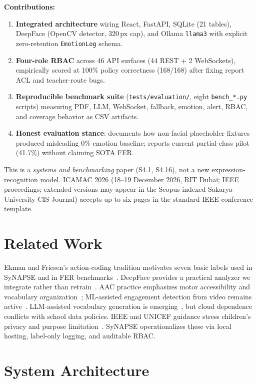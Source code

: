 \documentclass[conference]{IEEEtran}
\begin{document}
\textbf{Contributions:}
\begin{enumerate}
  \item \textbf{Integrated architecture} wiring React, FastAPI, SQLite (21 tables), DeepFace (OpenCV detector, 320\,px cap), and Ollama \texttt{llama3} with explicit zero-retention \texttt{EmotionLog} schema.
  \item \textbf{Four-role RBAC} across 46 API surfaces (44 REST + 2 WebSockets), empirically scored at 100\% policy correctness (168/168) after fixing report ACL and teacher-route bugs.
  \item \textbf{Reproducible benchmark suite} (\texttt{tests/evaluation/}, eight \texttt{bench\_*.py} scripts) measuring PDF, LLM, WebSocket, fallback, emotion, alert, RBAC, and coverage behavior as CSV artifacts.
  \item \textbf{Honest evaluation stance}: documents how non-facial placeholder fixtures produced misleading 0\% emotion baseline; reports current partial-class pilot (41.7\%) without claiming SOTA FER.
\end{enumerate}

This is a \emph{systems and benchmarking} paper (S4.1, S4.16), not a new expression-recognition model. ICAMAC 2026 (18--19 December 2026, RIT Dubai; IEEE proceedings; extended versions may appear in the Scopus-indexed Sakarya University CIS Journal) accepts up to six pages in the standard IEEE conference template.

\section{Related Work}
Ekman and Friesen's action-coding tradition motivates seven basic labels used in SyNAPSE and in FER benchmarks~\cite{ekman1978,goodfellow2013}. DeepFace provides a practical analyzer we integrate rather than retrain~\cite{serengil2020}. AAC practice emphasizes motor accessibility and vocabulary organization~\cite{asha2023,rowland2024}; ML-assisted engagement detection from video remains active~\cite{monkaresi2017}. LLM-assisted vocabulary generation is emerging~\cite{aslan2021}, but cloud dependence conflicts with school data policies. IEEE and UNICEF guidance stress children's privacy and purpose limitation~\cite{ieee2019,unicef2021}. SyNAPSE operationalizes these via local hosting, label-only logging, and auditable RBAC.

\section{System Architecture}
\end{document}
